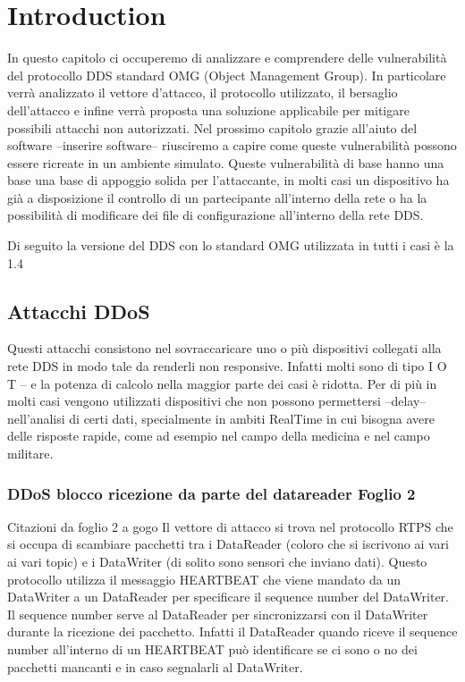 \chapter{Introduction}


In questo capitolo ci occuperemo di analizzare e comprendere delle vulnerabilità
del protocollo DDS standard OMG (Object Management Group). In particolare
verrà analizzato il vettore d'attacco, il protocollo utilizzato, il bersaglio
dell'attacco e infine verrà proposta una soluzione applicabile per
mitigare possibili attacchi non autorizzati. Nel prossimo capitolo grazie all'aiuto
del software --inserire software-- riusciremo a capire come queste vulnerabilità
possono essere ricreate in un ambiente simulato.
Queste vulnerabilità di base hanno una base una base di appoggio solida per 
l'attaccante, in molti casi un dispositivo ha già a disposizione il controllo
di un partecipante all'interno della rete o ha la possibilità di modificare
dei file di configurazione all'interno della rete DDS.

Di seguito la versione del DDS con lo standard OMG utilizzata in tutti i casi è
la 1.4




\section{Attacchi DDoS}
Questi attacchi consistono nel sovraccaricare uno o più dispositivi collegati alla 
rete DDS in modo tale da renderli non responsive. Infatti molti sono di tipo 
I O T -- e la potenza di calcolo nella maggior parte dei casi è ridotta.
Per di più in molti casi vengono utilizzati dispositivi
che non possono permettersi --delay-- nell'analisi di certi dati, specialmente in
ambiti RealTime in cui bisogna avere delle risposte rapide, come ad esempio
nel campo della medicina e nel campo militare.


\subsection{DDoS blocco ricezione da parte del datareader Foglio 2}

Citazioni da foglio 2 a gogo
Il vettore di attacco si trova nel protocollo RTPS che
si occupa di scambiare pacchetti tra i DataReader (coloro che si iscrivono ai vari
ai vari topic) e i DataWriter (di solito sono sensori che inviano dati).
Questo protocollo utilizza il messaggio HEARTBEAT che viene mandato da un DataWriter
a un DataReader per specificare il sequence number del DataWriter.
Il sequence number serve al DataReader per sincronizzarsi con il DataWriter 
durante la ricezione dei pacchetto.
Infatti il DataReader quando riceve il sequence number all'interno di un HEARTBEAT
può identificare se ci sono o no dei pacchetti mancanti e in caso segnalarli al
DataWriter.


